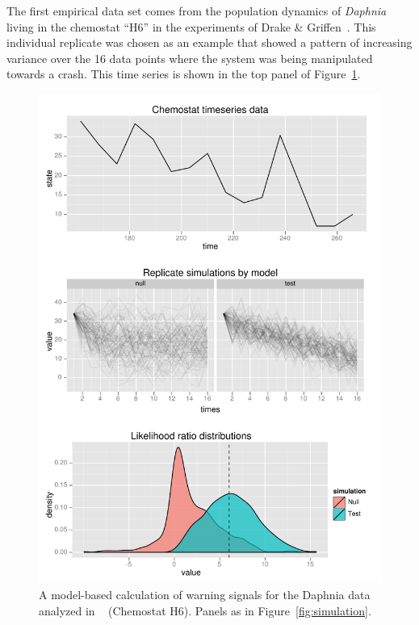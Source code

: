 \documentclass[authoryear,review,11pt]{elsarticle}
\begin{document}
The first empirical data set comes from the population dynamics of
\emph{Daphnia} living in the chemostat ``H6'' in the experiments of Drake \& Griffen~\citep{Drake2010}.
This individual replicate was chosen as an example that showed
a pattern of increasing variance over the 16 data points where the system was being manipulated towards a crash.
This time series is shown in the top panel of Figure~\ref{fig:chemostat}.

 \begin{figure}
   \begin{center}
     \includegraphics[width=.85\linewidth]{figures/Chemostat_warningsignal.pdf}
     \caption{A model-based calculation of warning signals for the Daphnia data analyzed in ~\citet{Drake2010} (Chemostat H6).  
     Panels as in Figure~\ref{fig:simulation}. }
     \label{fig:chemostat}
  \end{center}
 \end{figure}
\end{document}
